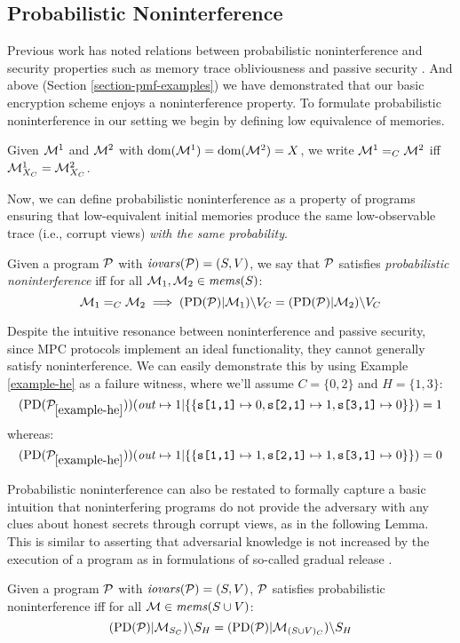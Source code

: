 \subsection{Probabilistic Noninterference} Previous work has noted
relations between probabilistic noninterference and security
properties such as memory trace obliviousness \cite{XXX} and passive
security \cite{XXX}. And above (Section \ref{section-pmf-examples}) we
have demonstrated that our basic encryption scheme enjoys a noninterference
property. To formulate probabilistic noninterference in
our setting we begin by defining low equivalence of memories.
\begin{definition}
  Given $\mathcal{M}^1$ and $\mathcal{M}^2$ with $\mathrm{dom}(\mathcal{M}^1) = \mathrm{dom}(\mathcal{M}^2) = X$,
  we write $\mathcal{M}^1 =_C \mathcal{M}^2$ iff $\mathcal{M}^1_{X_C} = \mathcal{M}^2_{X_C}$.
\end{definition}
Now, we can define probabilistic noninterference as a property of
programs ensuring that low-equivalent initial memories produce
the same low-observable trace (i.e., corrupt views) \emph{with the
same probability}. 
\begin{definition}
  Given a program $\mathcal{P}$ with $\mathit{iovars}(\mathcal{P}) = (S,V)$, we say that
  $\mathcal{P}$ satisfies \emph{probabilistic noninterference} iff for all
  $\mathcal{M}_1, \mathcal{M}_2 \in \mathit{mems}(S)$:
  $$\mathcal{M}_1 =_C \mathcal{M}_2 \implies
    (\mathrm{PD}(\mathcal{P})|\mathcal{M}_1)\backslash V_C =
    (\mathrm{PD}(\mathcal{P})|\mathcal{M}_2)\backslash V_C$$
\end{definition}

Despite the intuitive resonance between noninterference
and passive security, since MPC
protocols implement an ideal functionality, they cannot generally satisfy
noninterference. We can easily demonstrate this by using
Example \ref{example-he} as a failure witness, where we'll
assume $C = \{0,2\}$ and $H = \{1,3\}$:
$$
(\mathrm{PD}(\mathcal{P}_{\ref{example-he}}))({\mathit{out} \mapsto 1}|\{\{\texttt{s[1,1]} \mapsto 0, \texttt{s[2,1]} \mapsto 1, \texttt{s[3,1]} \mapsto 0 \} \})
= 1
$$
whereas:
$$
(\mathrm{PD}(\mathcal{P}_{\ref{example-he}}))({\mathit{out} \mapsto 1}|\{\{\texttt{s[1,1]} \mapsto 1, \texttt{s[2,1]} \mapsto 1, \texttt{s[3,1]} \mapsto 0 \} \})
= 0
$$

Probabilistic noninterference can also be restated to formally capture a
basic intuition that noninterfering programs do not provide
the adversary with any clues about honest secrets through corrupt
views, as in the following Lemma. This is similar to asserting that
adversarial knowledge is not increased by the execution of a program as in formulations
of so-called gradual release \cite{XXX}. 
\begin{lemma}
  Given a program $\mathcal{P}$ with $\mathit{iovars}(\mathcal{P}) = (S,V)$, 
  $\mathcal{P}$ satisfies probabilistic noninterference iff for all
  $\mathcal{M} \in \mathit{mems}(S \cup V)$:
  $$(\mathrm{PD}(\mathcal{P})|\mathcal{M}_{S_C})\backslash S_H =
    (\mathrm{PD}(\mathcal{P})|\mathcal{M}_{(S\cup V)_C})\backslash S_H $$
\end{lemma}


